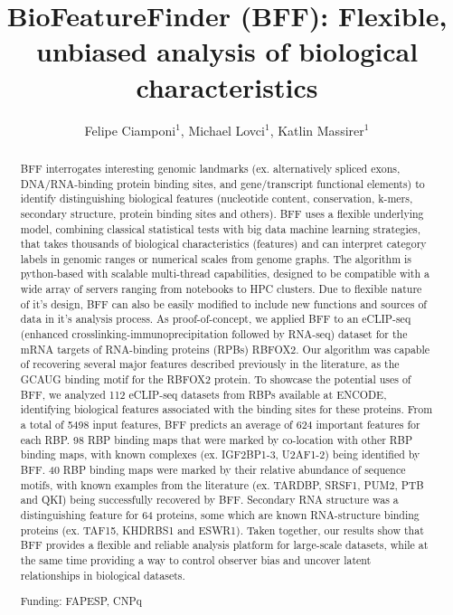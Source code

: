 \documentclass[twoside]{article}
\title{\vspace{-15mm}\fontsize{24pt}{10pt}\selectfont\textbf{BioFeatureFinder (BFF): Flexible, unbiased analysis of biological characteristics}} %
\author{Felipe Ciamponi$^1$, Michael Lovci$^1$, Katlin Massirer$^1$}
\affil{1 CBMEG - UNICAMP\\ }
\date{}
\begin{document}
\maketitle %

\thispagestyle{fancy} %


\begin{abstract}
BFF interrogates interesting genomic landmarks (ex. alternatively spliced exons, DNA/RNA-binding protein binding sites, and gene/transcript functional elements) to identify distinguishing biological features (nucleotide content, conservation, k-mers, secondary structure, protein binding sites and others). BFF uses a flexible underlying model, combining classical statistical tests with big data machine learning strategies, that takes thousands of biological characteristics (features) and can interpret category labels in genomic ranges or numerical scales from genome graphs. The algorithm is python-based with scalable multi-thread capabilities, designed to be compatible with a wide array of servers ranging from notebooks to HPC clusters. Due to flexible nature of it's design, BFF can also be easily modified to include new functions and sources of data in it's analysis process. As proof-of-concept, we applied BFF to an eCLIP-seq (enhanced crosslinking-immunoprecipitation followed by RNA-seq) dataset for the mRNA targets of RNA-binding proteins (RPBs) RBFOX2. Our algorithm was capable of recovering several major features described previously in the literature, as the GCAUG binding motif for the RBFOX2 protein. To showcase the potential uses of BFF, we analyzed 112 eCLIP-seq datasets from RBPs available at ENCODE, identifying biological features associated with the binding sites for these proteins. From a total of 5498 input features, BFF predicts an average of  624 important features for each RBP. 98 RBP binding maps that were marked by co-location with other RBP binding maps, with  known complexes (ex. IGF2BP1-3, U2AF1-2) being identified by BFF. 40 RBP binding maps were marked by their relative abundance of sequence motifs, with known examples from the literature (ex. TARDBP, SRSF1, PUM2, PTB and QKI) being successfully recovered by BFF. Secondary RNA structure was a distinguishing feature for 64 proteins, some which are known RNA-structure binding proteins (ex. TAF15, KHDRBS1 and ESWR1).  Taken together, our results show that BFF provides a flexible and reliable analysis platform for large-scale datasets, while at the same time providing a way to control observer bias and uncover latent relationships in biological datasets.

Funding: FAPESP, CNPq
\end{abstract}
\end{document}
